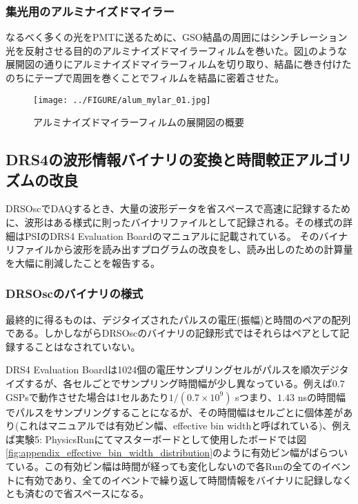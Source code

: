 \documentclass[../../main.tex]{subfiles}
\numberwithin{equation}{section}
\numberwithin{table}{section}
\numberwithin{figure}{section}
\begin{document}
\subsubsection{集光用のアルミナイズドマイラー}
  なるべく多くの光をPMTに送るために、GSO結晶の周囲にはシンチレーション光を反射させる目的のアルミナイズドマイラーフィルムを巻いた。図\ref{fig:preparation_alum_mylar}のような展開図の通りにアルミナイズドマイラーフィルムを切り取り、結晶に巻き付けたのちにテープで周囲を巻くことでフィルムを結晶に密着させた。
  \begin{figure}[H]
    \centering
    \texttt{[image: ../FIGURE/alum\_mylar\_01.jpg]}
    \caption{アルミナイズドマイラーフィルムの展開図の概要}\label{fig:preparation_alum_mylar}
  \end{figure}



  \FloatBarrier
  \subsection{DRS4の波形情報バイナリの変換と時間較正アルゴリズムの改良}
    DRSOscでDAQするとき、大量の波形データを省スペースで高速に記録するために、波形はある様式に則ったバイナリファイルとして記録される。その様式の詳細はPSIのDRS4 Evaluation Boardのマニュアル\cite{reparation:DRS4_manual}に記載されている。 そのバイナリファイルから波形を読み出すプログラムの改良をし、読み出しのための計算量を大幅に削減したことを報告する。

    \subsubsection{DRSOscのバイナリの様式}
      最終的に得るものは、デジタイズされたパルスの電圧(振幅)と時間のペアの配列である。しかしながらDRSOscのバイナリの記録形式ではそれらはペアとして記録することはなされていない。
      
      DRS4 Evaluation Boardは1024個の電圧サンプリングセルがパルスを順次デジタイズするが、各セルごとでサンプリング時間幅が少し異なっている。例えば$0.7$ GSPsで動作させた場合は1セルあたり$1/(0.7\times10^9)$ \si{\second}つまり、$1.43$ \si{\nano\second}の時間幅でパルスをサンプリングすることになるが、その時間幅はセルごとに個体差があり(これはマニュアルでは有効ビン幅、effective bin widthと呼ばれている)、例えば実験5: PhysicsRunにてマスターボードとして使用したボードでは図\ref{fig:appendix_effective_bin_width_distribution}のように有効ビン幅がばらついている。この有効ビン幅は時間が経っても変化しないので各Runの全てのイベントに有効であり、全てのイベントで繰り返して時間情報をバイナリに記録しなくとも済むので省スペースになる。
      
\end{document}
